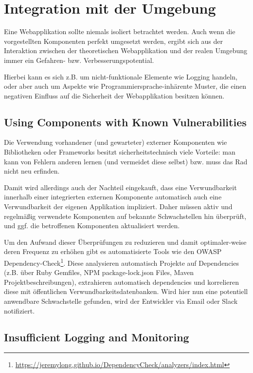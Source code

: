 \chapter{Integration mit der Umgebung}

Eine Webapplikation sollte niemals isoliert betrachtet werden. Auch wenn die vorgestellten Komponenten perfekt umgesetzt werden, ergibt sich aus der Interaktion zwischen der theoretischen Webapplikation und der realen Umgebung immer ein Gefahren- bzw. Verbesserungspotential.

Hierbei kann es sich z.B. um nicht-funktionale Elemente wie Logging handeln, oder aber auch um Aspekte wie Programmiersprache-inhärente Muster, die einen negativen Einfluss auf die Sicherheit der Webapplikation besitzen können.

\section{Using Components with Known Vulnerabilities}

Die Verwendung vorhandener (und gewarteter) externer Komponenten wie Bibliotheken oder Frameworks besitzt sicherheitstechnisch viele Vorteile: man kann von Fehlern anderen lernen (und vermeidet diese selbst) bzw. muss das Rad nicht neu erfinden.

Damit wird allerdings auch der Nachteil eingekauft, dass eine Verwundbarkeit innerhalb einer integrierten externen Komponente automatisch auch eine Verwundbarkeit der eigenen Applikation impliziert. Daher müssen aktiv und regelmäßig verwendete Komponenten auf bekannte Schwachstellen hin überprüft, und ggf. die betroffenen Komponenten aktualisiert werden.

Um den Aufwand dieser Überprüfungen zu reduzieren und damit optimaler-weise deren Frequenz zu erhöhen gibt es automatisierte Tools wie den OWASP Dependency-Check\footnote{\url{https://jeremylong.github.io/DependencyCheck/analyzers/index.html}}. Diese analysieren automatisch Projekte auf Dependencies (z.B. über Ruby Gemfiles, NPM package-lock.json Files, Maven Projektbeschreibungen), extrahieren automatisch dependencies und korrelieren diese mit öffentlichen Verwundbarkeitsdatenbanken. Wird hier nun eine potentiell anwendbare Schwachstelle gefunden, wird der Entwickler via Email oder Slack notifiziert.

\section{Insufficient Logging and Monitoring}

